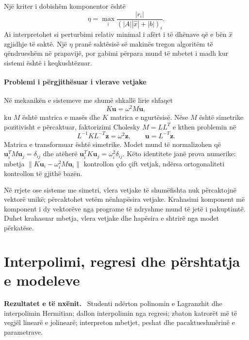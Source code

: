 \documentclass[11pt,oneside,openany]{book}
\newcommand{\vect}[1]{\bm{#1}}
\newenvironment{qellime}{\par\medskip\noindent\textbf{Rezultatet e të nxënit.}\ }{\par\medskip}
\begin{document}
Një kriter i dobishëm komponentor është
\begin{equation}
 \eta=\max_i\frac{|r_i|}{(|A||\widehat x|+|b|)_i}.
\end{equation}
Ai interpretohet si perturbimi relativ minimal i afërt i të dhënave që e bën $\widehat x$ zgjidhje të saktë. Një $\eta$ pranë saktësisë së makinës tregon algoritëm të qëndrueshëm në prapavijë, por gabimi përpara mund të mbetet i madh kur sistemi është i keqkushtëzuar.

\subsubsection{Problemi i përgjithësuar i vlerave vetjake}
Në mekanikën e sistemeve me shumë shkallë lirie shfaqet
\begin{equation}
 K\vect u=\omega^2M\vect u,
\end{equation}
ku $M$ është matrica e masës dhe $K$ matrica e ngurtësisë. Nëse $M$ është simetrike pozitivisht e përcaktuar, faktorizimi Cholesky $M=LL^T$ e kthen problemin në
\begin{equation}
 L^{-1}KL^{-T}\vect z=\omega^2\vect z,\qquad \vect u=L^{-T}\vect z.
\end{equation}
Matrica e transformuar është simetrike. Modet mund të normalizohen që $\vect u_i^TM\vect u_j=\delta_{ij}$ dhe atëherë $\vect u_i^TK\vect u_j=\omega_i^2\delta_{ij}$. Këto identitete janë prova numerike: mbetja $\|K\vect u_i-\omega_i^2M\vect u_i\|$ kontrollon çdo çift vetjak, ndërsa ortogonaliteti kontrollon të gjithë bazën.

Në rrjete ose sisteme me simetri, vlera vetjake të shumëfishta nuk përcaktojnë vektorë unikë; përcaktohet vetëm nënhapësira vetjake. Krahasimi komponent më komponent i dy vektorëve nga programe të ndryshme mund të jetë i pakuptimtë. Duhet krahasuar mbetja, vlera vetjake dhe hapësira e shtrirë nga modet përkatëse.





\chapter{Interpolimi, regresi dhe përshtatja e modeleve}
\begin{qellime}
Studenti ndërton polinomin e Lagranzhit dhe interpolimin Hermitian; dallon interpolimin nga regresi; zbaton katrorët më të vegjël linearë e jolinearë; interpreton mbetjet, peshat dhe pacaktueshmërinë e parametrave.
\end{qellime}
\end{document}
